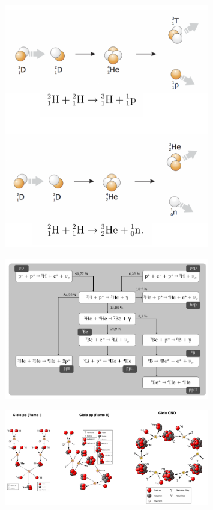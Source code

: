 \begin{figure}
    \centering
    \includegraphics[width=0.8\textwidth]{Figures/nuclear-physics3-fig10.pdf}
    \caption{}
    \label{fig:nuclear-physics3-fig10}
\end{figure}

\begin{figure}
    \centering
    \includegraphics[width=0.8\textwidth]{Figures/nuclear-physics3-fig11.pdf}
    \caption{}
    \label{fig:nuclear-physics3-fig11}
\end{figure}

\begin{figure}
    \centering
    \includegraphics[width=0.8\textwidth]{Figures/nuclear-physics3-fig12.pdf}
    \caption{}
    \label{fig:nuclear-physics3-fig12}
\end{figure}